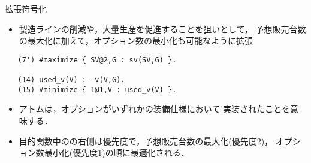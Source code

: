 \documentclass[dvipdfmx, 11pt]{beamer}
\begin{document}
\begin{frame}[fragile]{拡張符号化}
 \begin{itemize}
  \item 製造ラインの削減や，大量生産を促進することを狙いとして，
	予想販売台数の最大化に加えて，オプション数の最小化も可能なように拡張
 \end{itemize}
 \begin{exampleblock}{}
  \begin{lstlisting}
   (7') #maximize { SV@2,G : sv(SV,G) }.

   (14) used_v(V) :- v(V,G).
   (15) #minimize { 1@1,V : used_v(V) }.
  \end{lstlisting}
 \end{exampleblock}
 \begin{itemize}
  \item アトムは，オプションがいずれかの装備仕様において
	実装されたことを意味する．
  \item 目的関数中のの右側は優先度で，予想販売台数の最大化(優先度2)，
	オプション数最小化(優先度1)の順に最適化される．
 \end{itemize}
\end{frame}
\end{document}
